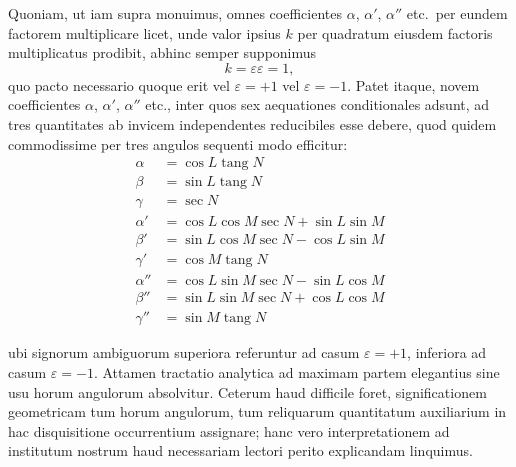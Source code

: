 \documentclass[12pt,a4paper]{article}
\DeclareMathOperator{\tang}{tang}
\begin{document}
Quoniam, ut iam supra monuimus, omnes coefficientes $\alpha$, $\alpha'$, $\alpha''$ etc.\ per eundem factorem multiplicare licet, unde valor ipsius $k$ per quadratum eiusdem factoris multiplicatus prodibit, abhinc semper supponimus
\[
k = \varepsilon\varepsilon = 1,
\]
quo pacto necessario quoque erit vel $\varepsilon = +1$ vel $\varepsilon = -1$. Patet itaque, novem coefficientes $\alpha$, $\alpha'$, $\alpha''$ etc., inter quos sex aequationes conditionales adsunt, ad tres quantitates ab invicem independentes reducibiles esse debere, quod quidem commodissime per tres angulos sequenti modo efficitur:
\[
\begin{aligned}
\alpha &= \cos L \tang N \\
\beta &= \sin L \tang N \\
\gamma &= \sec N \\
\alpha' &= \cos L \cos M \sec N + \sin L \sin M \\
\beta' &= \sin L \cos M \sec N - \cos L \sin M \\
\gamma' &= \cos M \tang N \\
\alpha'' &= \cos L \sin M \sec N - \sin L \cos M \\
\beta'' &= \sin L \sin M \sec N + \cos L \cos M \\
\gamma'' &= \sin M \tang N
\end{aligned}
\]

ubi signorum ambiguorum superiora referuntur ad casum $\varepsilon = +1$, inferiora ad casum $\varepsilon = -1$. Attamen tractatio analytica ad maximam partem elegantius sine usu horum angulorum absolvitur. Ceterum haud difficile foret, significationem geometricam tum horum angulorum, tum reliquarum quantitatum auxiliarium in hac disquisitione occurrentium assignare; hanc vero interpretationem ad institutum nostrum haud necessariam lectori perito explicandam linquimus.
\end{document}
